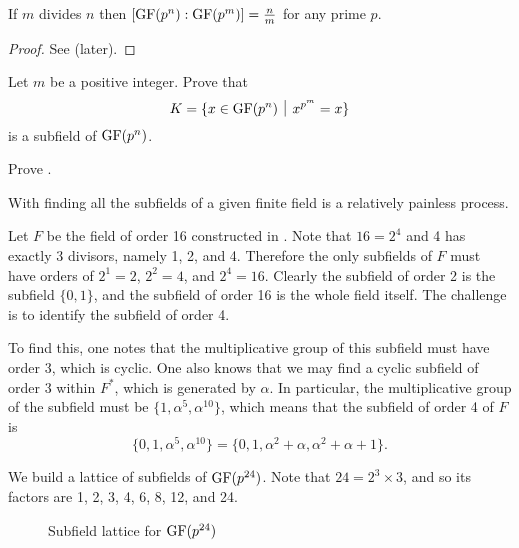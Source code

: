 \begin{corollary}\label{corollary-divisibility-of-finite-field-degree}
    If $m$ divides $n$ then $[\mathrm{GF}(p^n): \mathrm{GF}(p^m)] = \frac nm$ for any prime $p$.
\end{corollary}
\begin{proof}
    See  (later).
\end{proof}

\begin{exercise}\label{exercise-prime-power-elements-idempotent-is-subfield}
    Let $m$ be a positive integer. Prove that
    \[
        K = \{x \in \GF{p^n} \vert x^{p^m} = x\}
    \]
    is a subfield of $\mathrm{GF}(p^n)$.
\end{exercise}

\begin{exercise}\label{exercise-divisibility-of-finite-field-degree}
    Prove .
\end{exercise}

With  finding all the subfields of a given finite field is a relatively painless process.

\begin{example}
    Let $F$ be the field of order 16 constructed in . Note that $16 = 2^4$ and 4 has exactly 3 divisors, namely 1, 2, and 4. Therefore the only subfields of $F$ must have orders of $2^1 = 2$, $2^2 = 4$, and $2^4 = 16$. Clearly the subfield of order 2 is the subfield $\{0, 1\}$, and the subfield of order 16 is the whole field itself. The challenge is to identify the subfield of order 4.

    To find this, one notes that the multiplicative group of this subfield must have order 3, which is cyclic. One also knows that we may find a cyclic subfield of order 3 within $F^\ast$, which is generated by $\alpha$. In particular, the multiplicative group of the subfield must be $\{1, \alpha^5, \alpha^{10}\}$, which means that the subfield of order 4 of $F$ is
    \[
        \{0, 1, \alpha^5, \alpha^{10}\} = \{0, 1, \alpha^2 + \alpha, \alpha^2 + \alpha + 1\}.
    \]
\end{example}

\begin{example}
    We build a lattice of subfields of $\mathrm{GF}(p^{24})$. Note that $24 = 2^3 \times 3$, and so its factors are 1, 2, 3, 4, 6, 8, 12, and 24.

    \begin{figure}[H]
        \centering
        \caption{Subfield lattice for $\mathrm{GF}(p^{24})$}
    \end{figure}
\end{example}

